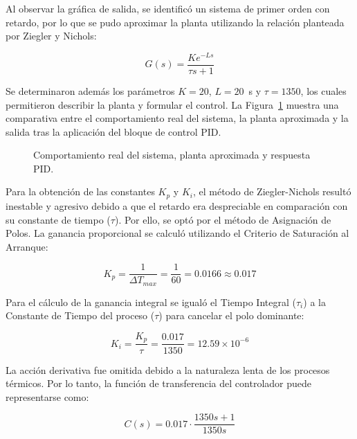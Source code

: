 \documentclass[11pt,tesis,twoside,openright,spanish]{upiiztt}
\begin{document}
Al observar la gráfica de salida, se identificó un sistema de primer orden con
retardo, por lo que se pudo aproximar la planta utilizando la relación planteada por
Ziegler y Nichols:

\begin{equation}
G(s) = \frac{K e^{-Ls}}{\tau s + 1}
\end{equation}

Se determinaron además los parámetros $K = 20$, $L = 20$~s y $\tau = 1350$, los cuales
permitieron describir la planta y formular el control. La Figura~\ref{fig:respuesta_pid} muestra una
comparativa entre el comportamiento real del sistema, la planta aproximada y la
salida tras la aplicación del bloque de control PID.

\begin{figure}[H]
  \centering
  \caption{Comportamiento real del sistema, planta aproximada y respuesta PID.}
  \label{fig:respuesta_pid}
\end{figure}

Para la obtención de las constantes $K_p$ y $K_i$, el método de Ziegler-Nichols resultó
inestable y agresivo debido a que el retardo era despreciable en comparación con
su constante de tiempo ($\tau$). Por ello, se optó por el método de Asignación de Polos.
La ganancia proporcional se calculó utilizando el Criterio de Saturación al Arranque:

\begin{equation}
K_p = \frac{1}{\Delta T_{max}} = \frac{1}{60} = 0.0166 \approx 0.017
\end{equation}

Para el cálculo de la ganancia integral se igualó el Tiempo Integral ($\tau_i$) a la
Constante de Tiempo del proceso ($\tau$) para cancelar el polo dominante:

\begin{equation}
K_i = \frac{K_p}{\tau} = \frac{0.017}{1350} = 12.59 \times 10^{-6}
\end{equation}

La acción derivativa fue omitida debido a la naturaleza lenta de los procesos
térmicos. Por lo tanto, la función de transferencia del controlador puede
representarse como:

\begin{equation}
C(s) = 0.017 \cdot \frac{1350s + 1}{1350s}
\end{equation}
\end{document}
